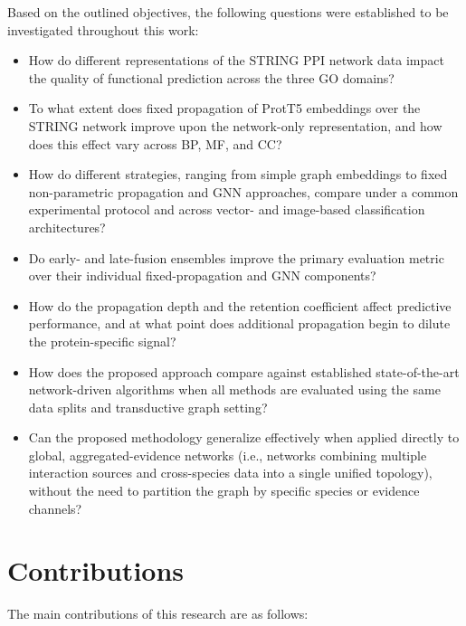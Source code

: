 \documentclass[Ingles]{ic-tese-v3}
\begin{document}
Based on the outlined objectives, the following questions were established to be investigated throughout this work:

\begin{itemize}

\item How do different representations of the STRING PPI network data impact the quality of functional prediction across the three GO domains?

\item To what extent does fixed propagation of ProtT5 embeddings over the STRING network improve upon the network-only representation, and how does this effect vary across BP, MF, and CC?

\item How do different strategies, ranging from simple graph embeddings to fixed non-parametric propagation and GNN approaches, compare under a common experimental protocol and across vector- and image-based classification architectures?

\item Do early- and late-fusion ensembles improve the primary evaluation metric over their individual fixed-propagation and GNN components?

\item How do the propagation depth and the retention coefficient affect predictive performance, and at what point does additional propagation begin to dilute the protein-specific signal?

\item How does the proposed approach compare against established state-of-the-art network-driven algorithms when all methods are evaluated using the same data splits and transductive graph setting?

\item Can the proposed methodology generalize effectively when applied directly to global, aggregated-evidence networks (i.e., networks combining multiple interaction sources and cross-species data into a single unified topology), without the need to partition the graph by specific species or evidence channels?

\end{itemize}

\section{Contributions}

The main contributions of this research are as follows:
\end{document}
